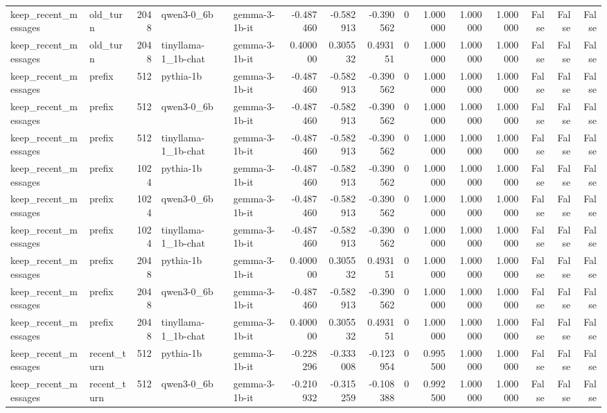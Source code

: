 \begin{tabular}{llrllrrrrrrrrrr}
keep_recent_messages & old_turn & 2048 & qwen3-0_6b & gemma-3-1b-it & -0.487460 & -0.582913 & -0.390562 & 0 & 1.000000 & 1.000000 & 1.000000 & False & False & False \\
keep_recent_messages & old_turn & 2048 & tinyllama-1_1b-chat & gemma-3-1b-it & 0.400000 & 0.305532 & 0.493151 & 0 & 1.000000 & 1.000000 & 1.000000 & False & False & False \\
keep_recent_messages & prefix & 512 & pythia-1b & gemma-3-1b-it & -0.487460 & -0.582913 & -0.390562 & 0 & 1.000000 & 1.000000 & 1.000000 & False & False & False \\
keep_recent_messages & prefix & 512 & qwen3-0_6b & gemma-3-1b-it & -0.487460 & -0.582913 & -0.390562 & 0 & 1.000000 & 1.000000 & 1.000000 & False & False & False \\
keep_recent_messages & prefix & 512 & tinyllama-1_1b-chat & gemma-3-1b-it & -0.487460 & -0.582913 & -0.390562 & 0 & 1.000000 & 1.000000 & 1.000000 & False & False & False \\
keep_recent_messages & prefix & 1024 & pythia-1b & gemma-3-1b-it & -0.487460 & -0.582913 & -0.390562 & 0 & 1.000000 & 1.000000 & 1.000000 & False & False & False \\
keep_recent_messages & prefix & 1024 & qwen3-0_6b & gemma-3-1b-it & -0.487460 & -0.582913 & -0.390562 & 0 & 1.000000 & 1.000000 & 1.000000 & False & False & False \\
keep_recent_messages & prefix & 1024 & tinyllama-1_1b-chat & gemma-3-1b-it & -0.487460 & -0.582913 & -0.390562 & 0 & 1.000000 & 1.000000 & 1.000000 & False & False & False \\
keep_recent_messages & prefix & 2048 & pythia-1b & gemma-3-1b-it & 0.400000 & 0.305532 & 0.493151 & 0 & 1.000000 & 1.000000 & 1.000000 & False & False & False \\
keep_recent_messages & prefix & 2048 & qwen3-0_6b & gemma-3-1b-it & -0.487460 & -0.582913 & -0.390562 & 0 & 1.000000 & 1.000000 & 1.000000 & False & False & False \\
keep_recent_messages & prefix & 2048 & tinyllama-1_1b-chat & gemma-3-1b-it & 0.400000 & 0.305532 & 0.493151 & 0 & 1.000000 & 1.000000 & 1.000000 & False & False & False \\
keep_recent_messages & recent_turn & 512 & pythia-1b & gemma-3-1b-it & -0.228296 & -0.333008 & -0.123954 & 0 & 0.995500 & 1.000000 & 1.000000 & False & False & False \\
keep_recent_messages & recent_turn & 512 & qwen3-0_6b & gemma-3-1b-it & -0.210932 & -0.315259 & -0.108388 & 0 & 0.992500 & 1.000000 & 1.000000 & False & False & False \\

\end{tabular}
